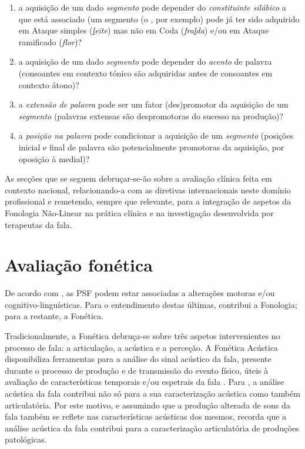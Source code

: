 \documentclass[output=paper]{LSP/langsci}
\begin{document}
\begin{enumerate}[label=(\roman*)]
\item a aquisição de um dado \textit{segmento} pode depender do \textit{constituinte silábico} a que está associado (um segmento (o , por exemplo) pode já ter sido adquirido em Ataque simples (\textit{\underline{l}eite}) mas não em Coda (\textit{fra\underline{l}da}) e/ou em Ataque ramificado (\textit{f\underline{l}or})?
\item a aquisição de um dado \textit{segmento} pode depender do \textit{acento} de palavra (consoantes em contexto tónico são adquiridas antes de consoantes em contexto átono)?
\item a \textit{extensão de palavra} pode ser um fator (des)promotor da aquisição de um \textit{segmento} (palavras extensas são despromotoras do sucesso na produção)?
\item a \textit{posição na palavra} pode condicionar a aquisição de um \textit{segmento} (posições inicial e final de palavra são potencialmente promotoras da aquisição, por oposição à medial)?
\end{enumerate}

As secções que se seguem debruçar-se-ão sobre a avaliação clínica feita em contexto nacional, relacionando-a com as diretivas internacionais neste domínio profissional e remetendo, sempre que relevante, para a integração de aspetos da Fonologia Não-Linear na prática clínica e na investigação desenvolvida por terapeutas da fala.

\section{Avaliação fonética}
\label{sec:lousada_avaliacao_fonet}

De acordo com \cite{broomfielddodd2004}, as PSF podem estar associadas a alterações motoras e/ou cognitivo-linguísticas. Para o entendimento destas últimas, contribui a Fonologia; para a restante, a Fonética.

Tradicionalmente, a Fonética debruça-se sobre três aspetos intervenientes no processo de fala: a articulação, a acústica e a perceção. A Fonética Acústica disponibiliza ferramentas para a análise do sinal acústico da fala, presente durante o processo de produção e de transmissão do evento físico, úteis à avaliação de características temporais e/ou espetrais da fala \citep{perkell1997}. Para \citet{rielysmith2003}, a análise acústica da fala contribui não só para a sua caracterização acústica como também articulatória. Por este motivo, e assumindo que a produção alterada de sons da fala também se reflete nas características acústicas dos mesmos, \citet{kent_etal2010} recorda que a análise acústica da fala contribui para a caracterização articulatória de produções patológicas. 
\end{document}
